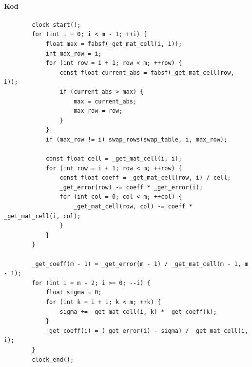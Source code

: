 \documentclass{article}
\begin{document}
	\paragraph{Kod}
	\begin{verbatim}
		clock_start();
		for (int i = 0; i < m - 1; ++i) {
			float max = fabsf(_get_mat_cell(i, i));
			int max_row = i;
			for (int row = i + 1; row < m; ++row) {
				const float current_abs = fabsf(_get_mat_cell(row, i));
				if (current_abs > max) {
					max = current_abs;
					max_row = row;
				}
			}
			if (max_row != i) swap_rows(swap_table, i, max_row);
			
			const float cell = _get_mat_cell(i, i);
			for (int row = i + 1; row < m; ++row) {
				const float coeff = _get_mat_cell(row, i) / cell;
				_get_error(row) -= coeff * _get_error(i);
				for (int col = 0; col < m; ++col) {
					_get_mat_cell(row, col) -= coeff * _get_mat_cell(i, col);
				}
			}
		}
		
		_get_coeff(m - 1) = _get_error(m - 1) / _get_mat_cell(m - 1, m - 1);
		for (int i = m - 2; i >= 0; --i) {
			float sigma = 0;
			for (int k = i + 1; k < m; ++k) {
				sigma += _get_mat_cell(i, k) * _get_coeff(k);
			}
			_get_coeff(i) = (_get_error(i) - sigma) / _get_mat_cell(i, i);
		}
		clock_end();
	\end{verbatim}
	
\end{document}
